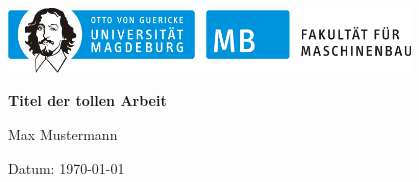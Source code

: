 %
\begin{titlepage}                  %
  \renewcommand{\baselinestretch}{1.25}\normalsize
    \includegraphics[width=0.8\textwidth]{bilder/mb_sign_druck.png}
  \\
  \begin{center}
    \begin{Large}
      \textbf{Titel der tollen Arbeit}\\
    \end{Large}
		\vspace{1cm}
		\begin{large}
		Max Mustermann
		\end{large}
  \end{center}
  \vspace{0.68\textheight}
  Datum: \today
\end{titlepage}
%
